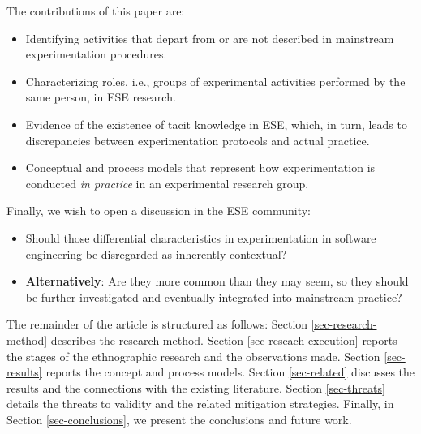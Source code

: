The contributions of this paper are:

\begin{itemize}
  \item Identifying activities that depart from or are not described in mainstream experimentation procedures. 
  \item Characterizing roles, i.e., groups of experimental activities performed by the same person, in ESE research.
  \item Evidence of the existence of tacit knowledge in ESE, which, in turn, leads to discrepancies between experimentation protocols and actual practice.
  \item Conceptual and process models that represent how experimentation is conducted \textit{in practice} in an experimental research group.
\end{itemize}

Finally, we wish to open a discussion in the ESE community: 
\begin{itemize}
  \item Should those differential characteristics in experimentation in software engineering be disregarded as inherently contextual?
  \item  \textbf{Alternatively}: Are they more common than they may seem, so they should be further investigated and eventually integrated into mainstream practice?
\end{itemize}

The remainder of the article is structured as follows: Section \ref{sec-research-method} describes the research method. Section \ref{sec-reseach-execution} reports the stages of the ethnographic research and the observations made. Section \ref{sec-results} reports the concept and process models. Section \ref{sec-related} discusses the results and the connections with the existing literature. Section \ref{sec-threats} details the threats to validity and the related mitigation strategies. Finally, in Section \ref{sec-conclusions}, we present the conclusions and future work.